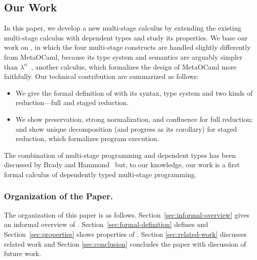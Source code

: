 
\subsection{Our Work}
In this paper, we develop a new multi-stage calculus \LMD by extending
the existing multi-stage calculus \LTP\cite{Hanada2014} with dependent
types and study its properties.  We base our work on \LTP, in which
the four multi-stage constructs are handled slightly differently from
MetaOCaml, because its type system and semantics are arguably simpler
than \(\lambda^\alpha\)~\cite{taha2003environment}, another calculus,
which formalizes the design of MetaOCaml more faithfully.  Our
technical contribution are summarized as follows:
\begin{itemize}
\item We give the formal definition of \LMD with its syntax, 
  type system and two kinds of reduction---full and staged reduction.
\item We show preservation, strong normalization, and confluence for
  full reduction; and show unique decomposition (and progress as its
  corollary) for staged reduction, which formalizes program execution.
\end{itemize}
The combination of multi-stage programming and dependent types has
been discussed by Brady and Hammond~\cite{brady2006dependently} but,
to our knowledge, our work is a first formal calculus of dependently
typed multi-stage programming.


\subsubsection{Organization of the Paper.}

The organization of this paper is as follows.
Section~\ref{sec:informal-overview} gives an informal overview of
\LMD.  Section~\ref{sec:formal-definition} defines \LMD and
Section~\ref{sec:properties} shows properties of \LMD.  Section
\ref{sec:related-work} discusses related work and Section
\ref{sec:conclusion} concludes the paper with discussion of future
work.
